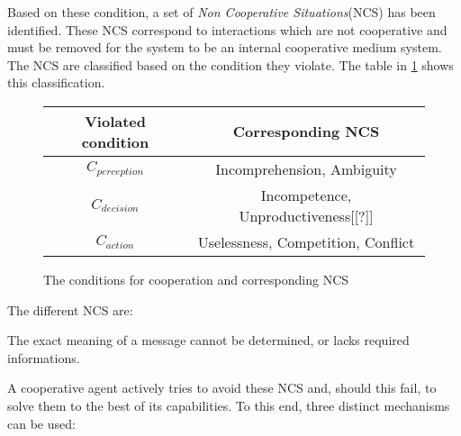 Based on these condition, a set of \emph{Non Cooperative Situations}(NCS) has been identified. These NCS correspond to interactions which are not cooperative and must be removed for the system to be an internal cooperative medium system. The NCS are classified based on the condition they violate. The table in \figurename{} \ref{NCS} shows this classification.

\begin{figure}
\centering
\begin{tabular}{|c|c|}
\hline
\textbf{Violated condition}	& \textbf{Corresponding NCS} \\
\hline
$C_{perception}$     & Incomprehension, Ambiguity     \\
\hline
$C_{decision}$      & Incompetence, Unproductiveness[[?]] \\
\hline
$C_{action}$     & Uselessness, Competition, Conflict\\
\hline
\end{tabular}
\caption{The conditions for cooperation and corresponding NCS}
\label{NCS}
\end{figure}

The different NCS are:

 {The exact meaning of a message cannot be determined, or lacks required informations.}

A cooperative agent actively tries to avoid these NCS and, should this fail, to solve them to the best of its capabilities. To this end, three distinct mechanisms can be used\cite{bonjean2009engineering}:


